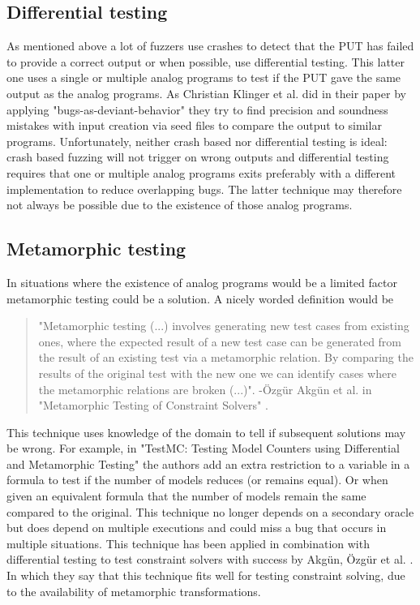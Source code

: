 \subsection{Differential testing}
\label{fuzzing:DifferentialTesting}
As mentioned above a lot of fuzzers use crashes to detect that the PUT has failed to provide a correct output or when possible, use differential testing. This latter one uses a single or multiple analog programs to test if the PUT gave the same output as the analog programs. As Christian Klinger et al. did in their paper \cite{48klinger2019differentially} by applying "bugs-as-deviant-behavior" they try to find precision and soundness mistakes with input creation via seed files to compare the output to similar programs. 
Unfortunately, neither crash based nor differential testing is ideal: crash based fuzzing will not trigger on wrong outputs and differential testing requires that one or multiple analog programs exits preferably with a different implementation to reduce overlapping bugs. The latter technique may therefore not always be possible due to the existence of those analog programs.

\subsection{Metamorphic testing}
\label{fuzzing:MetamorphicTesting}
In situations where the existence of analog programs would be a limited factor metamorphic testing could be a solution. A nicely worded definition would be 

\begin{quote}
	\label{quote:MetaMorphic}
	"Metamorphic testing (...) involves generating new test cases from existing ones, where the expected result of a new test case can be generated from the result of an existing test via a metamorphic relation. By comparing the results of the
	original test with the new one we can identify cases where the metamorphic relations are broken (...)".
	\newline
	-\"{O}zg\"{u}r Akg\"{u}n et al. in "Metamorphic Testing of Constraint Solvers" \cite{50akgun2018metamorphic}.
\end{quote}

\noindent This technique uses knowledge of the domain to tell if subsequent solutions may be wrong. For example, in "TestMC: Testing Model Counters using Differential and Metamorphic Testing" \cite{49usman2020testmc} the authors add an extra restriction to a variable in a formula to test if the number of models reduces (or remains equal). Or when given an equivalent formula that the number of models remain the same compared to the original. This technique no longer depends on a secondary oracle but does depend on multiple executions and could miss a bug that occurs in multiple situations. This technique has been applied in combination with differential testing to test constraint solvers with success by Akg{\"u}n, {\"O}zg{\"u}r et al. \cite{50akgun2018metamorphic}. In which they say that this technique fits well for testing constraint solving, due to the availability of metamorphic transformations.

